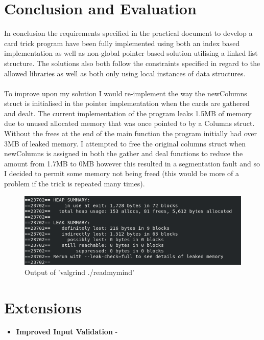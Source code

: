 \documentclass[11]{article}
\begin{document}
	\section{Conclusion and Evaluation}
	In conclusion the requirements specified in the practical document to develop a card trick program have been fully implemented using both an index based implementation as well as non-global pointer based solution utilising a linked list structure. The solutions also both follow the constraints specified in regard to the allowed libraries as well as both only using local instances of data structures. \\\\ To improve upon my solution I would re-implement the way the newColumns struct is initialised in the pointer implementation when the cards are gathered and dealt. The current implementation of the program leaks 1.5MB of memory due to unused allocated memory that was once pointed to by a Columns struct. Without the frees at the end of the main function the program initially had over 3MB of leaked memory. I attempted to free the original columns struct when newColumns is assigned in both the gather and deal functions to reduce the amount from 1.7MB to 0MB however this resulted in a segmentation fault and so I decided to permit some memory not being freed (this would be more of a problem if the trick is repeated many times).
	
				\begin{figure}[h!]
					\caption{Output of 'valgrind ./readmymind'}				\centering
					\includegraphics[scale=0.5]{ValGrind.png}
				\end{figure}
	
	
	\section{Extensions}
		\begin{itemize}
			\item \textbf{Improved Input Validation} - 
		\end{itemize}
		
\end{document}
